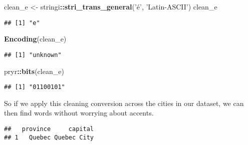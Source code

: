 \documentclass[
]{book}
\newenvironment{Shaded}{\begin{snugshade}}{\end{snugshade}}
\newcommand{\DataTypeTok}[1]{\textcolor[rgb]{0.13,0.29,0.53}{#1}}
\newcommand{\KeywordTok}[1]{\textcolor[rgb]{0.13,0.29,0.53}{\textbf{#1}}}
\newcommand{\NormalTok}[1]{#1}
\newcommand{\OperatorTok}[1]{\textcolor[rgb]{0.81,0.36,0.00}{\textbf{#1}}}
\newcommand{\OtherTok}[1]{\textcolor[rgb]{0.56,0.35,0.01}{#1}}
\newcommand{\StringTok}[1]{\textcolor[rgb]{0.31,0.60,0.02}{#1}}
\begin{document}
\begin{Shaded}
\begin{Highlighting}[]
\NormalTok{clean_e <-}\StringTok{ }\NormalTok{stringi}\OperatorTok{::}\KeywordTok{stri_trans_general}\NormalTok{(}\StringTok{'é'}\NormalTok{, }\StringTok{'Latin-ASCII'}\NormalTok{)}
\NormalTok{clean_e}
\end{Highlighting}
\end{Shaded}

\begin{verbatim}
## [1] "e"
\end{verbatim}

\begin{Shaded}
\begin{Highlighting}[]
\KeywordTok{Encoding}\NormalTok{(clean_e)}
\end{Highlighting}
\end{Shaded}

\begin{verbatim}
## [1] "unknown"
\end{verbatim}

\begin{Shaded}
\begin{Highlighting}[]
\NormalTok{pryr}\OperatorTok{::}\KeywordTok{bits}\NormalTok{(clean_e)}
\end{Highlighting}
\end{Shaded}

\begin{verbatim}
## [1] "01100101"
\end{verbatim}

So if we apply this cleaning conversion across the cities in our dataset, we can then find words without worrying about accents.

\begin{Shaded}
\end{Shaded}

\begin{verbatim}
##   province     capital
## 1   Quebec Quebec City
\end{verbatim}
\end{document}
